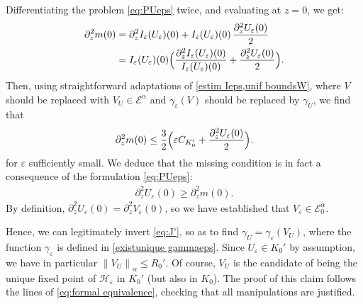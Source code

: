 \documentclass[10pt]{amsart}
\let\mathcal\mathscr
\theoremstyle{plain}
\theoremstyle{definition}
\renewcommand{\H}{\mathcal{H}_\eps}
\let\eps\varepsilon
\newcommand{\nalph}[1]{\left\lVert#1\right\rVert_\alpha}
\newcommand{\Ea}{\mathcal{E}^\alpha}
\newcommand{\Eaz}{\mathcal{E}^\alpha_0}
\begin{document}
Differentiating the problem \eqref{eq:PUeps} twice, and evaluating at $z=0$, we get:
\begin{align*}
\partial_z^2 m(0) & = \partial_z^2 I_\eps(U_\eps)(0) + I_\eps(U_\eps)(0)\, \dfrac{\partial_z^2 U_\eps(0)}{2} \\
& = I_\eps(U_\eps)(0) \Bigl(\dfrac{\partial_z^2 I_\eps(U_\eps)(0)}{I_\eps(U_\eps)(0)} + \dfrac{\partial_z^2 U_\eps(0)}{2} \Bigr).
\end{align*}
Then, using straightforward adaptations of \cref{estim Ieps,unif boundsW}, where $V$ should be replaced with $V_U\in \Ea$ and $\gamma_\eps(V)$ should be replaced by $\gamma_U$, we find that
\begin{align*}
\partial_z^2 m(0) \leq \frac32 \Bigl(\eps C_{K_0'} + \dfrac{\partial_z^2 U_\eps(0)}{2} \Bigr).
\end{align*}
for $\eps$ sufficiently small.
We deduce that the missing condition is in fact a consequence of the formulation \eqref{eq:PUeps}:
\begin{align*}
\partial_z^2 U_\eps(0) \geq \partial_z^2 m(0).
\end{align*}
By definition, $\partial_z^2 U_\eps(0) = \partial_z^2 V_\eps(0)$, so we have established that $V_\eps \in \Eaz$.

Hence, we can legitimately invert \eqref{eq:J'}, so as to find $\gamma_U = \gamma_\eps(V_U)$, where the function $\gamma_\eps$ is defined in \cref{existunique gammaeps}. Since $U_\eps\in K_0'$ by assumption, we have in particular $\nalph{V_U}\leq R_0'$. Of course, $V_U$ is the candidate of being the unique fixed point of $\H$ in $K_0'$ (but also in $K_0$). The proof of this claim follows the lines of \cref{eq:formal equivalence}, checking that all manipulations are justified.
\end{document}
